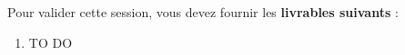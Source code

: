 
Pour valider cette session, vous devez fournir les \textbf{livrables suivants} :

\begin{enumerate}
\item TO DO
\end{enumerate}